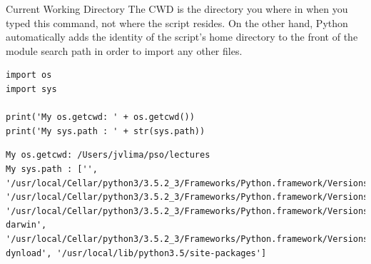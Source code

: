 \documentclass[xcolor=dvipsnames, 10pt, presentation,aspectratio=169]{beamer}
\begin{document}
\begin{frame}[label={sec:orgec5a489},fragile]{Current Working Directory}
 The CWD is the directory you where in when you typed this command, not
where the script resides.
On the other hand, Python automatically adds the identity of the
script's home directory to the front of the module search path in
order to import any other files.
\lstset{language=Python,label= ,caption= ,captionpos=b,numbers=none}
\begin{lstlisting}
import os
import sys

print('My os.getcwd: ' + os.getcwd())
print('My sys.path : ' + str(sys.path))
\end{lstlisting}

\begin{verbatim}
My os.getcwd: /Users/jvlima/pso/lectures
My sys.path : ['', '/usr/local/Cellar/python3/3.5.2_3/Frameworks/Python.framework/Versions/3.5/lib/python35.zip', '/usr/local/Cellar/python3/3.5.2_3/Frameworks/Python.framework/Versions/3.5/lib/python3.5', '/usr/local/Cellar/python3/3.5.2_3/Frameworks/Python.framework/Versions/3.5/lib/python3.5/plat-darwin', '/usr/local/Cellar/python3/3.5.2_3/Frameworks/Python.framework/Versions/3.5/lib/python3.5/lib-dynload', '/usr/local/lib/python3.5/site-packages']
\end{verbatim}
\end{frame}
\end{document}
